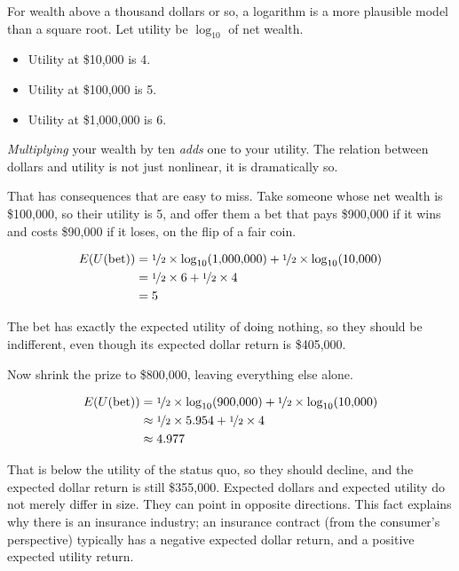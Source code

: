 \documentclass[
  11pt,
  letterpaper,
]{scrbook}
\providecommand{\tightlist}{%
  \setlength{\itemsep}{0pt}\setlength{\parskip}{0pt}}
\begin{document}
For wealth above a thousand dollars or so, a logarithm is a more
plausible model than a square root. Let utility be \(\log_{10}\) of net
wealth.

\begin{itemize}
\tightlist
\item
  Utility at \$10,000 is 4.
\item
  Utility at \$100,000 is 5.
\item
  Utility at \$1,000,000 is 6.
\end{itemize}

\emph{Multiplying} your wealth by ten \emph{adds} one to your utility.
The relation between dollars and utility is not just nonlinear, it is
dramatically so.

That has consequences that are easy to miss. Take someone whose net
wealth is \$100,000, so their utility is 5, and offer them a bet that
pays \$900,000 if it wins and costs \$90,000 if it loses, on the flip of
a fair coin.

\begin{align*}
E(U(\text{bet})) &= \nicefrac{1}{2} \times \log_{10}(1{,}000{,}000) + \nicefrac{1}{2} \times \log_{10}(10{,}000) \\
&= \nicefrac{1}{2} \times 6 + \nicefrac{1}{2} \times 4 \\
&= 5
\end{align*}

The bet has exactly the expected utility of doing nothing, so they
should be indifferent, even though its expected dollar return is
\$405,000.

Now shrink the prize to \$800,000, leaving everything else alone.

\begin{align*}
E(U(\text{bet})) &= \nicefrac{1}{2} \times \log_{10}(900{,}000) + \nicefrac{1}{2} \times \log_{10}(10{,}000) \\
&\approx \nicefrac{1}{2} \times 5.954 + \nicefrac{1}{2} \times 4 \\
&\approx 4.977
\end{align*}

That is below the utility of the status quo, so they should decline, and
the expected dollar return is still \$355,000. Expected dollars and
expected utility do not merely differ in size. They can point in
opposite directions. This fact explains why there is an insurance
industry; an insurance contract (from the consumer's perspective)
typically has a negative expected dollar return, and a positive expected
utility return.
\end{document}
